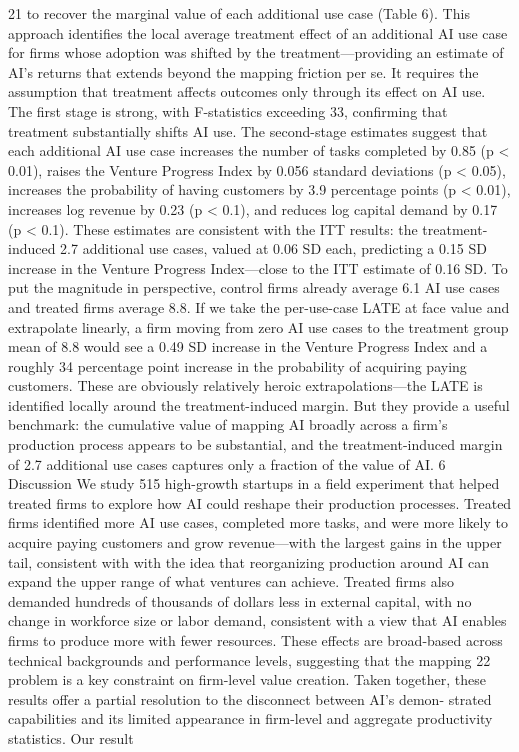 21
to recover the marginal value of each additional use case (Table 6). This approach identifies the
local average treatment effect of an additional AI use case for firms whose adoption was shifted by
the treatment—providing an estimate of AI’s returns that extends beyond the mapping friction per
se. It requires the assumption that treatment affects outcomes only through its effect on AI use.
The first stage is strong, with F-statistics exceeding 33, confirming that treatment substantially
shifts AI use. The second-stage estimates suggest that each additional AI use case increases the
number of tasks completed by 0.85 (p < 0.01), raises the Venture Progress Index by 0.056 standard
deviations (p < 0.05), increases the probability of having customers by 3.9 percentage points (p <
0.01), increases log revenue by 0.23 (p < 0.1), and reduces log capital demand by 0.17 (p < 0.1).
These estimates are consistent with the ITT results: the treatment-induced 2.7 additional use cases,
valued at 0.06 SD each, predicting a 0.15 SD increase in the Venture Progress Index—close to the
ITT estimate of 0.16 SD.
To put the magnitude in perspective, control firms already average 6.1 AI use cases and treated
firms average 8.8. If we take the per-use-case LATE at face value and extrapolate linearly, a firm
moving from zero AI use cases to the treatment group mean of 8.8 would see a 0.49 SD increase
in the Venture Progress Index and a roughly 34 percentage point increase in the probability of
acquiring paying customers.
These are obviously relatively heroic extrapolations—the LATE is
identified locally around the treatment-induced margin. But they provide a useful benchmark: the
cumulative value of mapping AI broadly across a firm’s production process appears to be substantial,
and the treatment-induced margin of 2.7 additional use cases captures only a fraction of the value
of AI.
6
Discussion
We study 515 high-growth startups in a field experiment that helped treated firms to explore how
AI could reshape their production processes. Treated firms identified more AI use cases, completed
more tasks, and were more likely to acquire paying customers and grow revenue—with the largest
gains in the upper tail, consistent with with the idea that reorganizing production around AI can
expand the upper range of what ventures can achieve. Treated firms also demanded hundreds of
thousands of dollars less in external capital, with no change in workforce size or labor demand,
consistent with a view that AI enables firms to produce more with fewer resources. These effects
are broad-based across technical backgrounds and performance levels, suggesting that the mapping
22
problem is a key constraint on firm-level value creation.
Taken together, these results offer a partial resolution to the disconnect between AI’s demon-
strated capabilities and its limited appearance in firm-level and aggregate productivity statistics.
Our result

